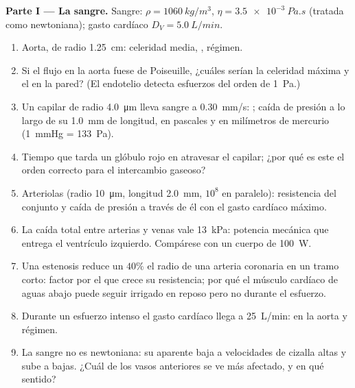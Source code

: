\begin{problem}
\medskip
\noindent\textbf{Parte I --- La sangre.}
Sangre: $\rho = \qty{1060}{kg/m^3}$, $\eta = \qty{3.5e-3}{Pa.s}$ (tratada como
newtoniana); gasto cardíaco $D_V = \qty{5.0}{L/min}$.
\begin{enumerate}
  \item Aorta, de radio \qty{1.25}{cm}: celeridad media, , régimen.
  \item Si el flujo en la aorta fuese de Poiseuille, ¿cuáles serían la
        celeridad máxima y el  en la pared? (El endotelio
        detecta esfuerzos del orden de \qty{1}{Pa}.)
  \item Un capilar de radio \qty{4.0}{\micro m} lleva sangre a
        \qty{0.30}{mm/s}: ; caída de presión a lo largo
        de su \qty{1.0}{mm} de longitud, en pascales y en milímetros de
        mercurio (\qty{1}{mmHg} = \qty{133}{Pa}).
  \item Tiempo que tarda un glóbulo rojo en atravesar el capilar; ¿por qué
        es este el orden correcto para el intercambio gaseoso?
  \item Arteriolas (radio \qty{10}{\micro m}, longitud \qty{2.0}{mm}, $10^8$
        en paralelo): resistencia del conjunto y caída de presión a través
        de él con el gasto cardíaco máximo.
  \item La caída total entre arterias y venas vale \qty{13}{kPa}: potencia
        mecánica que entrega el ventrículo izquierdo. Compárese con un
        cuerpo de \qty{100}{W}.
  \item Una estenosis reduce un $40\%$ el radio de una arteria coronaria
        en un tramo corto: factor por el que crece su resistencia; por qué
        el músculo cardíaco de aguas abajo puede seguir irrigado en reposo
        pero no durante el esfuerzo.
  \item Durante un esfuerzo intenso el gasto cardíaco llega a
        \qty{25}{L/min}:  en la aorta y régimen.
  \item La sangre no es newtoniana: su  aparente baja a
        velocidades de cizalla altas y sube a bajas. ¿Cuál de los vasos
        anteriores se ve más afectado, y en qué sentido?
\end{enumerate}


\end{problem}
